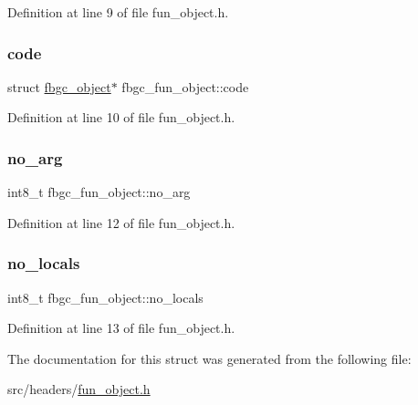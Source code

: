Definition at line 9 of file fun\+\_\+object.\+h.

\mbox{\label{structfbgc__fun__object_ababc5d5bdec0e8779dc740716ba99be9}} 
\subsubsection{\texorpdfstring{code}{code}}
{\footnotesize\ttfamily struct \hyperlink{structfbgc__object}{fbgc\+\_\+object}$\ast$ fbgc\+\_\+fun\+\_\+object\+::code}



Definition at line 10 of file fun\+\_\+object.\+h.

\mbox{\label{structfbgc__fun__object_af106fb302ed3e6c52cee66d9788a6d47}} 
\subsubsection{\texorpdfstring{no\+\_\+arg}{no\_arg}}
{\footnotesize\ttfamily int8\+\_\+t fbgc\+\_\+fun\+\_\+object\+::no\+\_\+arg}



Definition at line 12 of file fun\+\_\+object.\+h.

\mbox{\label{structfbgc__fun__object_aede4839acfb9685972872af368c22a40}} 
\subsubsection{\texorpdfstring{no\+\_\+locals}{no\_locals}}
{\footnotesize\ttfamily int8\+\_\+t fbgc\+\_\+fun\+\_\+object\+::no\+\_\+locals}



Definition at line 13 of file fun\+\_\+object.\+h.



The documentation for this struct was generated from the following file\+:\begin{DoxyCompactItemize}
\item 
src/headers/\hyperlink{fun__object_8h}{fun\+\_\+object.\+h}\end{DoxyCompactItemize}
